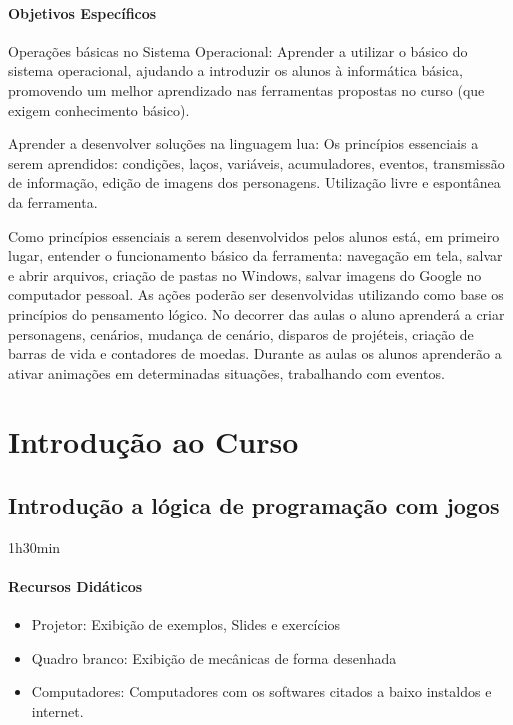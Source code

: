 \documentclass[letterpaper,10pt,brazil]{sphinxmanual}
\begin{document}
\subsubsection*{Objetivos Específicos}

\sphinxAtStartPar
Operações básicas no Sistema Operacional:
Aprender a utilizar o básico do sistema operacional, ajudando a introduzir os alunos à
informática básica, promovendo um melhor aprendizado nas ferramentas propostas
no curso (que exigem conhecimento básico).

\sphinxAtStartPar
Aprender a desenvolver soluções na linguagem lua:
Os princípios essenciais a serem aprendidos: condições, laços, variáveis,
acumuladores, eventos, transmissão de informação, edição de imagens dos
personagens. Utilização livre e espontânea da ferramenta.

\sphinxAtStartPar
Como princípios essenciais a serem desenvolvidos pelos alunos está, em primeiro
lugar, entender o funcionamento básico da ferramenta: navegação em tela, salvar e
abrir arquivos, criação de pastas no Windows, salvar imagens do Google no
computador pessoal. As ações poderão ser desenvolvidas utilizando como base os
princípios do pensamento lógico. No decorrer das aulas o aluno aprenderá a criar
personagens, cenários, mudança de cenário, disparos de projéteis, criação de
barras de vida e contadores de moedas. Durante as aulas os alunos aprenderão a
ativar animações em determinadas situações, trabalhando com eventos.

\sphinxstepscope


\chapter{Introdução ao Curso}
\label{\detokenize{modelo_aula_02:introducao-ao-curso}}\label{\detokenize{modelo_aula_02::doc}}

\section{Introdução a lógica de programação com jogos}
\label{\detokenize{modelo_aula_02:introducao-a-logica-de-programacao-com-jogos}}
\sphinxAtStartPar
{} 1h30min
\subsubsection*{Recursos Didáticos}
\begin{itemize}
\item {} 
\sphinxAtStartPar
Projetor: Exibição de exemplos, Slides e exercícios

\item {} 
\sphinxAtStartPar
Quadro branco: Exibição de mecânicas de forma desenhada

\item {} 
\sphinxAtStartPar
Computadores: Computadores com os softwares citados a baixo instaldos e internet.

\end{itemize}
\end{document}
